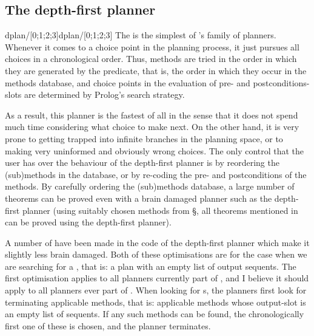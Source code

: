 \subsection {The depth-first planner}
\label{depth-first-planner}
\begin{predicate}{dplan/[0;1;2;3]}{dplan/[0;1;2;3]}
The  is the simplest of {\clam}'s family of
planners. Whenever it comes to a choice point in the planning
process, it just pursues all choices in a chronological order. Thus,
methods are tried in the order in which they are generated by the
 predicate, that is, the order 
in which they occur in the methods database, and choice points in the
evaluation of pre- and postconditions-slots are determined by Prolog's
search strategy. 

As a result, this planner is the fastest of all in the sense that it
does not spend much time considering what choice to make next. On the
other hand, it is very prone to getting trapped into infinite branches
in the planning space, or to making very uninformed and obviously
wrong choices. The only control that the user has over the behaviour
of the depth-first planner is by reordering the (sub)methods in
the database, 
or by re-coding the pre- and postconditions of the methods. By
carefully ordering the (sub)methods database, a large number of
theorems can be proved even with a brain damaged planner such as the
depth-first planner (using suitably chosen methods from \S{}, all theorems mentioned in \cite{pub413} can be proved
using the depth-first planner). 

A number of  have been made in the code of the
depth-first planner which make it slightly less brain damaged.
Both of these optimisations are for the case when we are searching for a
, that is: a plan with an empty list of output
sequents. The first optimisation applies to all planners currently part
of \clam, and I believe it should apply to all planners ever part of
\clam.  When looking for s, the planners first
look for terminating applicable methods, that is: applicable
methods whose output-slot is an empty list of sequents. If any such
methods can be found, the chronologically first one of these is chosen,
and the planner terminates.


\end{predicate}
